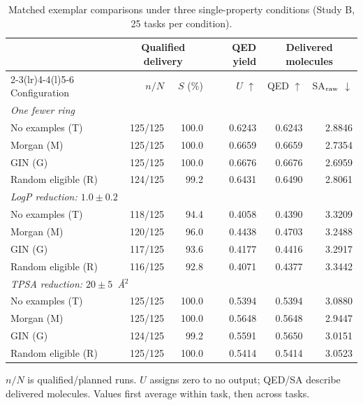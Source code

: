\begin{table}[!htbp]
\centering\small
\caption{Matched exemplar comparisons under three single-property conditions (Study B, 25 tasks per condition).}
\label{tab:downstream}
\setlength{\tabcolsep}{4pt}
\renewcommand{\arraystretch}{1.08}
\begin{tabular*}{\linewidth}{@{\extracolsep{\fill}}lrrrrr@{}}
\toprule
 & \multicolumn{2}{c}{Qualified delivery} & QED yield & \multicolumn{2}{c}{Delivered molecules} \\
\cmidrule(lr){2-3}\cmidrule(lr){4-4}\cmidrule(l){5-6}
Configuration & $n/N$ & $S$ (\%) & $U$ $\uparrow$ & QED $\uparrow$ & SA$_{\rm raw}$ $\downarrow$ \\
\midrule
\multicolumn{6}{l}{\textit{One fewer ring}} \\
No examples (T) & 125/125 & 100.0 & 0.6243 & 0.6243 & 2.8846 \\
Morgan (M) & 125/125 & 100.0 & 0.6659 & 0.6659 & 2.7354 \\
GIN (G) & 125/125 & 100.0 & 0.6676 & 0.6676 & 2.6959 \\
Random eligible (R) & 124/125 & 99.2 & 0.6431 & 0.6490 & 2.8061 \\
\midrule
\multicolumn{6}{l}{\textit{LogP reduction: $1.0\pm0.2$}} \\
No examples (T) & 118/125 & 94.4 & 0.4058 & 0.4390 & 3.3209 \\
Morgan (M) & 120/125 & 96.0 & 0.4438 & 0.4703 & 3.2488 \\
GIN (G) & 117/125 & 93.6 & 0.4177 & 0.4416 & 3.2917 \\
Random eligible (R) & 116/125 & 92.8 & 0.4071 & 0.4377 & 3.3442 \\
\midrule
\multicolumn{6}{l}{\textit{TPSA reduction: $20\pm5$~\AA$^2$}} \\
No examples (T) & 125/125 & 100.0 & 0.5394 & 0.5394 & 3.0880 \\
Morgan (M) & 125/125 & 100.0 & 0.5648 & 0.5648 & 2.9447 \\
GIN (G) & 124/125 & 99.2 & 0.5591 & 0.5650 & 3.0151 \\
Random eligible (R) & 125/125 & 100.0 & 0.5414 & 0.5414 & 3.0523 \\
\bottomrule
\end{tabular*}
\par\smallskip
\begin{minipage}{\linewidth}\footnotesize
$n/N$ is qualified/planned runs. $U$ assigns zero to no output; QED/SA describe delivered molecules. Values first average within task, then across tasks.
\end{minipage}
\end{table}
